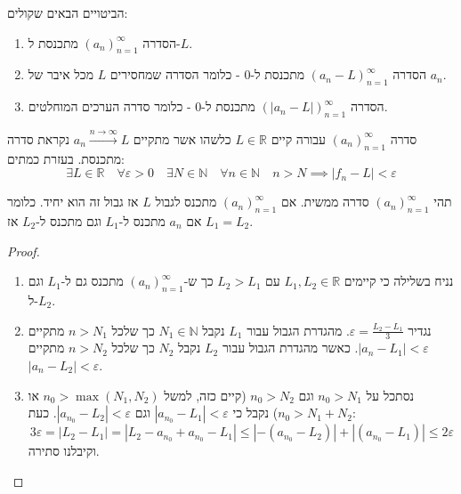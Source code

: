 \documentclass{tstextbook}
\begin{document}
\begin{proposition}
הביטויים הבאים שקולים:

  \begin{enumerate}
    \item הסדרה \((a_n)_{n=1}^\infty\) מתכנסת ל-\(L\). 


    \item הסדרה \((a_n-L)_{n=1}^\infty\) מתכנסת ל-0 - כלומר הסדרה שמחסירים \(L\) מכל איבר של \(a_{n}\). 


    \item הסדרה \((|a_{n}-L|)_{n=1}^\infty\) מתכנסת ל-0 - כלומר סדרה הערכים המוחלטים. 


  \end{enumerate}
\end{proposition}
\begin{definition}
סדרה \((a_n)_{n=1}^\infty\) עבורה קיים \(L \in \mathbb{R}\) כלשהו אשר מתקיים \(a_{n}\xrightarrow{n\to \infty}L\) נקראת סדרה מתכנסת. בעזרת כמתים:
$$\exists L \in \mathbb{R}\quad \forall\varepsilon>0\quad \exists N \in \mathbb{N}\quad \forall n\in \mathbb{N}\quad n>N\implies |f_{n}-L|<\varepsilon$$

\end{definition}
\begin{proposition}
תהי \((a_n)_{n=1}^\infty\) סדרה ממשית. אם \((a_n)_{n=1}^\infty\) מתכנס לגבול \(L\) אז גבול זה הוא יחיד. כלומר אם \(a_{n}\) מתכנס ל-\(L_{1}\) וגם מתכנס ל-\(L_{2}\) אז \(L_{1}=L_{2}\).

\end{proposition}
\begin{proof}
  \begin{enumerate}
    \item נניח בשלילה כי קיימים \(L_{1},L_{2} \in \mathbb{R}\) עם \(L_{2}>L_{1}\) כך ש-\((a_n)_{n=1}^\infty\) מתכנס גם ל-\(L_{1}\) וגם ל-\(L_{2}\). 


    \item נגדיר \(\varepsilon= \frac{L_{2}-L_{1}}{3}\). מהגדרת הגבול עבור \(L_{1}\) נקבל \(N_{1} \in \mathbb{N}\) כך שלכל \(n>N_{1}\) מתקיים \(\lvert a_{n}-L_{1} \rvert<\varepsilon\). כאשר מהגדרת הגבול עבור \(L_{2}\) נקבל \(N_{2}\) כך שלכל \(n>N_{2}\) מתקיים \(|a_{n}-L_{2}|<\varepsilon\). 


    \item נסתכל על \(n_{0}>N_{1}\) וגם \(n_{0}>N_{2}\) (קיים כזה, למשל \(n_{0}>\max(N_{1},N_{2})\) או \(n_{0}>N_{1}+N_{2}\)) נקבל כי \(|a_{n_{0}}-L_{1}|<\varepsilon\) וגם \(|a_{n_{0}}-L_{2}|<\varepsilon\). כעת: 
$$3\varepsilon=\lvert L_{2}-L_{1} \rvert =|L_{2}-a_{n_{0}}+a_{n_{0}}-L_{1}|\leq |-(a_{n_{0}}-L_{2})|+|(a_{n_{0}}-L_{1})|\leq 2\varepsilon$$
וקיבלנו סתירה.


  \end{enumerate}
\end{proof}
\end{document}
